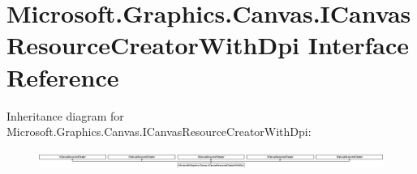 \hypertarget{interface_microsoft_1_1_graphics_1_1_canvas_1_1_i_canvas_resource_creator_with_dpi}{}\section{Microsoft.\+Graphics.\+Canvas.\+I\+Canvas\+Resource\+Creator\+With\+Dpi Interface Reference}
\label{interface_microsoft_1_1_graphics_1_1_canvas_1_1_i_canvas_resource_creator_with_dpi}
Inheritance diagram for Microsoft.\+Graphics.\+Canvas.\+I\+Canvas\+Resource\+Creator\+With\+Dpi\+:\begin{figure}[H]
\begin{center}
\leavevmode
\includegraphics[height=0.613699cm]{interface_microsoft_1_1_graphics_1_1_canvas_1_1_i_canvas_resource_creator_with_dpi}
\end{center}
\end{figure}
